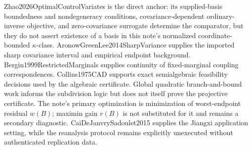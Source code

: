 Zhao2026OptimalControlVariates is the direct anchor: its supplied-basis boundedness and nondegeneracy conditions, covariance-dependent ordinary-inverse objective, and zero-covariance surrogate determine the comparator, but they do not assert existence of a basis in this note's normalized coordinate-bounded \(\kappa\)-class.  AronowGreenLee2014SharpVariance supplies the imported sharp covariance interval and empirical endpoint background.  Bergin1999RestrictedMarginals supplies continuity of fixed-marginal coupling correspondences.  Collins1975CAD supports exact semialgebraic feasibility decisions used by the algebraic certificate.  Global quadratic branch-and-bound work informs the subdivision logic but does not itself prove the projective certificate.  The note's primary optimization is minimization of worst-endpoint residual \(w(B)\); maximin gain \(r(B)\) is not substituted for it and remains a secondary diagnostic.  CaiDeJanvrySadoulet2015 supplies the Jiangxi application setting, while the reanalysis protocol remains explicitly unexecuted without authenticated replication data.